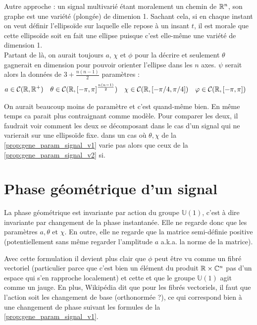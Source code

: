 \begin{proposition}\label{prop:gene_param_signal_v2}
Autre approche : un signal multivarié étant moralement un chemin de $\mathbb{R}^n$, son graphe est une variété (plongée) de dimenion 1. Sachant cela, si en chaque instant on veut définir l'ellipsoïde sur laquelle elle repose à un insant $t$, il est morale que cette ellipsoïde soit en fait une ellipse puisque c'est elle-même une variété de dimension 1.
\\
Partant de là, on aurait toujours $a$, $\chi$ et $\phi$ pour la décrire et seulement $\theta$ gagnerait en dimension pour pouvoir orienter l'ellipse dans les $n$ axes. $\psi$ serait alors la données de $3+\frac{n(n-1)}{2}$ paramètres :
\begin{align*}
	a&\in\mathcal{C}(\mathbb{R},\mathbb{R}^+)  &  \theta&\in\mathcal{C}(\mathbb{R}, [-\pi,\pi]^{\frac{n(n-1)}{2}})  &  \chi&\in\mathcal{C}(\mathbb{R}, [-\pi/4,\pi/4])  &  \varphi&\in\mathcal{C}(\mathbb{R}, [-\pi,\pi])
\end{align*}
\end{proposition}

On aurait beaucoup moins de paramètre et c'est quand-même bien. En même temps ca parait plus contraignant comme modèle. Pour comparer les deux, il faudrait voir comment les deux se décomposant dans le cas d'un signal qui ne varierait sur une ellipsoïde fixe. \ie dans un cas où $\theta,\chi$ de la \cref{prop:gene_param_signal_v1} varie pas alors que ceux de la \cref{prop:gene_param_signal_v2} si.




\setcounter{figure}{0}
\setcounter{lstlisting}{0}

\section{Phase géométrique d'un signal}\label{sec:phasegeo}

La phase géométrique est invariante par action du groupe $\mathbb{U}(1)$, c'est à dire invariante par changement de la phase instantanée. Elle ne regarde donc que les paramètres $a, \theta$ et $\chi$. En outre, elle ne regarde que la matrice semi-définie positive (potentiellement sans même regarder l'amplitude $a$ a.k.a. la norme de la matrice).

Avec cette formulation il devient plus clair que $\phi$ peut être vu comme un fibré vectoriel (particulier parce que c'est bien un élément du produit $\mathbb{R}\times\mathbb{C}^n$ pas d'un espace qui s'en rapproche localement) et cette et que le groupe $\mathbb{U}(1)$ agit comme un jauge. En plus, Wikipédia dit que pour les fibrés vectoriels, il faut que l'action soit les changement de base (orthonormée ?), ce qui correspond bien à une changement de phase suivant les formules de la \cref{prop:gene_param_signal_v1}.

